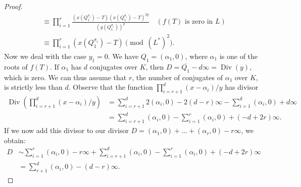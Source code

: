\documentclass[a4paper, 12pt]{amsart}
\theoremstyle{definition}
\theoremstyle{plain}
\theoremstyle{plain}
\theoremstyle{plain}
\theoremstyle{plain}
\theoremstyle{remark}
\theoremstyle{remark}
\theoremstyle{plain}
\DeclareMathOperator{\Div}{Div}
\begin{document}
\begin{proof}
\begin{align*}
			&\equiv \prod_{i=1}^r \frac{(x(Q_1^{\sigma_i})-T)(x(Q_1^{\sigma_i})-T)^{2g}}{(y(Q_1^{\sigma_i}))^2}\quad (f(T)\text{ is zero in } L)\\
			&\equiv \prod_{i=1}^r (x(Q_1^{\sigma_i})-T)\pmod{(L^*)^2}.
		\end{align*}
	Now we deal with the case $y_1=0$. We have $Q_1=(\alpha_1,0)$, where $\alpha_1$ is one of the roots of $f(T)$. If $\alpha_1$ has $d$ conjugates over $K$, then $D=\overline{Q_1}-d\infty=\Div(y)$, which is zero. We can thus assume that $r$, the number of conjugates of $\alpha_1$ over $K$, is strictly less than $d$. Observe that the function $\prod_{i=r+1}^d (x-\alpha_i)/y$ has divisor
	\begin{align*}
		\Div\left(\prod_{i=r+1}^d(x-\alpha_i)/y\right)&=\sum_{i=r+1}^d 2(\alpha_i,0)-2(d-r)\infty-\sum_{i=1}^d(\alpha_i,0)+d\infty\\
		&=\sum_{i=r+1}^d(\alpha_i,0)-\sum_{i=1}^r(\alpha_i,0)+(-d+2r)\infty.
	\end{align*}
	If we now add this divisor to our divisor $D=(\alpha_1,0)+\ldots+(\alpha_r,0)-r\infty$, we obtain:
	\begin{align*}
		D&\sim \sum_{i=1}^r(\alpha_i,0)-r\infty+\sum_{i=r+1}^d(\alpha_i,0)-\sum_{i=1}^r(\alpha_i,0)+(-d+2r)\infty\\
		&=\sum_{r+1}^d(\alpha_i,0)-(d-r)\infty.
	\end{align*}
	

\end{proof}
\end{document}
